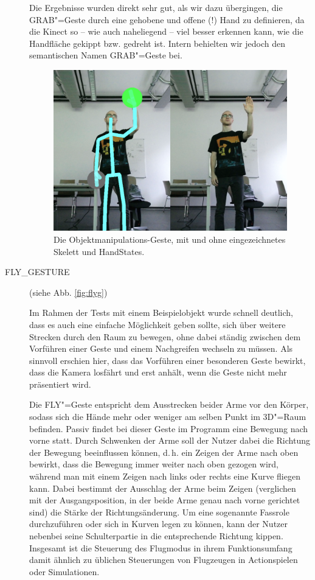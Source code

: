 \begin{description}
		Die Ergebnisse wurden direkt sehr gut, als wir dazu übergingen, die GRAB"=Geste durch eine gehobene und offene (!) Hand zu definieren, da die Kinect so -- wie auch naheliegend -- viel besser erkennen kann, wie die Handfläche gekippt bzw. gedreht ist. Intern behielten wir jedoch den semantischen Namen \glqq GRAB\grqq"=Geste bei.
		\begin{figure}[h!]
		\centering
		\includegraphics[width=.8\textwidth]{pictures/grab_.png}
		\caption{Die Objektmanipulations-Geste, mit und ohne eingezeichnetes Skelett und HandStates.}\label{fig:grabg}
		\end{figure}
		\par
		\item[FLY\_GESTURE] (siehe Abb. \ref{fig:flyg})\par
		Im Rahmen der Tests mit einem Beispielobjekt wurde schnell deutlich, dass es auch eine einfache Möglichkeit geben sollte, sich über weitere Strecken durch den Raum zu bewegen, ohne dabei ständig zwischen dem Vorführen einer Geste und einem \glqq Nachgreifen\grqq{} wechseln zu müssen. Als sinnvoll erschien hier, dass das Vorführen einer besonderen Geste bewirkt, dass die Kamera losfährt und erst anhält, wenn die Geste nicht mehr präsentiert wird.\par 
		Die FLY"=Geste entspricht dem Ausstrecken beider Arme vor den Körper, sodass sich die Hände mehr oder weniger am selben Punkt im 3D"=Raum befinden. Passiv findet bei dieser Geste im Programm eine Bewegung nach vorne statt. Durch Schwenken der Arme soll der Nutzer dabei die Richtung der Bewegung beeinflussen können, d.\,h. ein Zeigen der Arme nach oben bewirkt, dass die Bewegung immer weiter nach oben gezogen wird, während man mit einem Zeigen nach links oder rechts eine Kurve fliegen kann. Dabei bestimmt der Ausschlag der Arme beim Zeigen (verglichen mit der Ausgangsposition, in der beide Arme genau nach vorne gerichtet sind) die Stärke der Richtungsänderung. Um eine sogenannte Fassrole durchzuführen oder sich in Kurven legen zu können, kann der Nutzer nebenbei seine Schulterpartie in die entsprechende Richtung kippen. Insgesamt ist die Steuerung des Flugmodus in ihrem Funktionsumfang damit ähnlich zu üblichen Steuerungen von Flugzeugen in Actionspielen oder Simulationen.\par 

\end{description}
